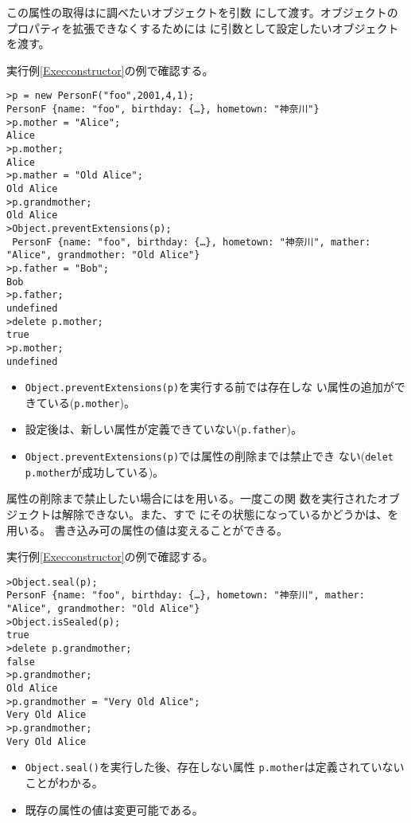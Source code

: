 この属性の取得はに調べたいオブジェクトを引数
にして渡す。オブジェクトのプロパティを拡張できなくするためには
に引数として設定したいオブジェクトを渡す。
 \begin{Exec}\upshape
  実行例\ref{Execconstructor}の例で確認する。
\begin{Verbatim}
>p = new PersonF("foo",2001,4,1);
PersonF {name: "foo", birthday: {…}, hometown: "神奈川"}
>p.mother = "Alice";
Alice
>p.mother;
Alice
>p.mather = "Old Alice";
Old Alice
>p.grandmother;
Old Alice
>Object.preventExtensions(p);
 PersonF {name: "foo", birthday: {…}, hometown: "神奈川", mather: "Alice", grandmother: "Old Alice"}
>p.father = "Bob";
Bob
>p.father;
undefined
>delete p.mother;
true
>p.mother;
undefined
\end{Verbatim}
 \end{Exec}
\begin{itemize}
 \item \texttt{Object.preventExtensions(p)}を実行する前では存在しな
       い属性の追加ができている(\texttt{p.mother})。
 \item 設定後は、新しい属性が定義できていない(\texttt{p.father})。
 \item \texttt{Object.preventExtensions(p)}では属性の削除までは禁止でき
       ない(\texttt{delet p.mother}が成功している)。
\end{itemize}
属性の削除まで禁止したい場合にはを用いる。一度この関
数を実行されたオブジェクトは解除できない。また、すで
にその状態になっているかどうかは、を用いる。
書き込み可の属性の値は変えることができる。
 \begin{Exec}\upshape\label{ExecContined}
  実行例\ref{Execconstructor}の例で確認する。
\begin{Verbatim}
>Object.seal(p);
PersonF {name: "foo", birthday: {…}, hometown: "神奈川", mather: "Alice", grandmother: "Old Alice"}
>Object.isSealed(p);
true
>delete p.grandmother;
false
>p.grandmother;
Old Alice
>p.grandmother = "Very Old Alice";
Very Old Alice
>p.grandmother;
Very Old Alice
\end{Verbatim}
 \end{Exec}
 \begin{itemize}
  \item \texttt{Object.seal()}を実行した後、存在しない属性
        \texttt{p.mother}は定義されていないことがわかる。
  \item 既存の属性の値は変更可能である。
 \end{itemize}
